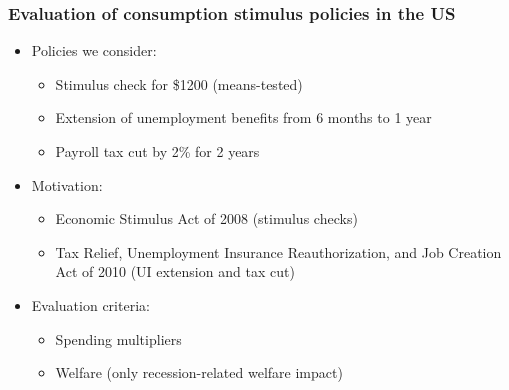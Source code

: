 \documentclass[pdflatex,aspectratio=169]{beamer}
\begin{document}
\begin{frame}
  \frametitle{Evaluation of consumption stimulus policies in the US}
  \begin{itemize}[<+->]
    \itemsep = .5\bigskipamount
    \item
          Policies we consider:
          \begin{itemize}[<+->]
            \itemsep = .25\bigskipamount
            \item
                  Stimulus check for \$1200 (means-tested)
            \item
                  Extension of unemployment benefits from 6 months to 1 year
            \item
                  Payroll tax cut by 2\% for 2 years
          \end{itemize}
          \medskip
    \item
          Motivation:
          \begin{itemize}[<+->]
            \itemsep = .25\bigskipamount
            \item
                  Economic Stimulus Act of 2008 (stimulus checks)
            \item
                  Tax Relief, Unemployment Insurance Reauthorization, and Job Creation Act of 2010 (UI extension and tax cut)
          \end{itemize}
          \medskip
    \item
          Evaluation criteria:
          \begin{itemize}[<+->]
            \itemsep = .25\bigskipamount
            \item
                  Spending multipliers
            \item
                  Welfare (only recession-related welfare impact)
          \end{itemize}
  \end{itemize}
\end{frame}
\end{document}
